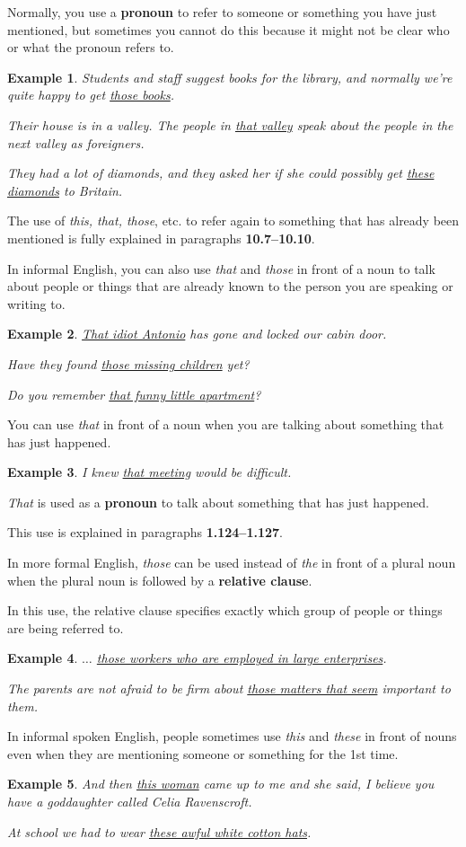 \documentclass[oneside]{book}
\numberwithin{equation}{section}
\newtheorem{example}{Example}[section]
\begin{document}
Normally, you use a \textbf{pronoun} to refer to someone or something you have just mentioned, but sometimes you cannot do this because it might not be clear who or what the pronoun refers to.
\begin{example}
    Students and staff suggest books for the library, and normally we're quite happy to get \underline{those books}.
    
    Their house is in a valley. The people in \underline{that valley} speak about the people in the next valley as foreigners.
    
    They had a lot of diamonds, and they asked her if she could possibly get \underline{these diamonds} to Britain.
\end{example}
The use of \textit{this, that, those}, etc. to refer again to something that has already been mentioned is fully explained in paragraphs \textbf{10.7--10.10}.

%
\noindent{} In informal English, you can also use \textit{that} and \textit{those} in front of a noun to talk about people or things that are already known to the person you are speaking or writing to.
\begin{example}
    \underline{That idiot Antonio} has gone and locked our cabin door.
    
    Have they found \underline{those missing children} yet?
    
    Do you remember \underline{that funny little apartment}?
\end{example}
%
\noindent{} You can use \textit{that} in front of a noun when you are talking about something that has just happened.
\begin{example}
    I knew \underline{that meeting} would be difficult.
\end{example}
\textit{That} is used as a \textbf{pronoun} to talk about something that has just happened.

This use is explained in paragraphs \textbf{1.124--1.127}.

%
\noindent{} In more formal English, \textit{those} can be used instead of \textit{the} in front of a plural noun when the plural noun is followed by a \textbf{relative clause}.

In this use, the relative clause specifies exactly which group of people or things are being referred to.
\begin{example}
    $\ldots$ \underline{those workers who are employed in large enterprises}.
    
    The parents are not afraid to be firm about \underline{those matters that seem} important to them.
\end{example}
%
\noindent{} In informal spoken English, people sometimes use \textit{this} and \textit{these} in front of nouns even when they are mentioning someone or something for the 1st time.
\begin{example}
    And then \underline{this woman} came up to me and she said, I believe you have a goddaughter called Celia Ravenscroft.
    
    At school we had to wear \underline{these awful white cotton hats}.
\end{example}
\end{document}
